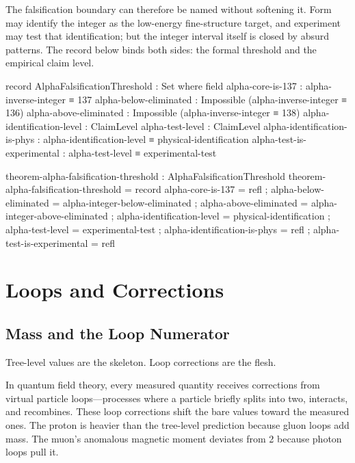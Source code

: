 \documentclass[11pt,a4paper]{book}
\begin{document}
The falsification boundary can therefore be named without softening it. Form may identify the integer as the low-energy fine-structure target, and experiment may test that identification; but the integer interval itself is closed by absurd patterns. The record below binds both sides: the formal threshold and the empirical claim level.

\begin{code}
record AlphaFalsificationThreshold : Set where
  field
    alpha-core-is-137            : alpha-inverse-integer ≡ 137
    alpha-below-eliminated       : Impossible (alpha-inverse-integer ≡ 136)
    alpha-above-eliminated       : Impossible (alpha-inverse-integer ≡ 138)
    alpha-identification-level   : ClaimLevel
    alpha-test-level             : ClaimLevel
    alpha-identification-is-phys : alpha-identification-level ≡ physical-identification
    alpha-test-is-experimental   : alpha-test-level ≡ experimental-test

theorem-alpha-falsification-threshold : AlphaFalsificationThreshold
theorem-alpha-falsification-threshold = record
  { alpha-core-is-137            = refl
  ; alpha-below-eliminated       = alpha-integer-below-eliminated
  ; alpha-above-eliminated       = alpha-integer-above-eliminated
  ; alpha-identification-level   = physical-identification
  ; alpha-test-level             = experimental-test
  ; alpha-identification-is-phys = refl
  ; alpha-test-is-experimental   = refl }
\end{code}

\part*{Loops and Corrections}

\chapter{Mass and the Loop Numerator}
\label{ch:mass-loop-numerator}

Tree-level values are the skeleton. Loop corrections are the flesh.

In quantum field theory, every measured quantity receives corrections from virtual particle loops---processes where a particle briefly splits into two, interacts, and recombines. These loop corrections shift the bare values toward the measured ones. The proton is heavier than the tree-level prediction because gluon loops add mass. The muon's anomalous magnetic moment deviates from 2 because photon loops pull it.
\end{document}
